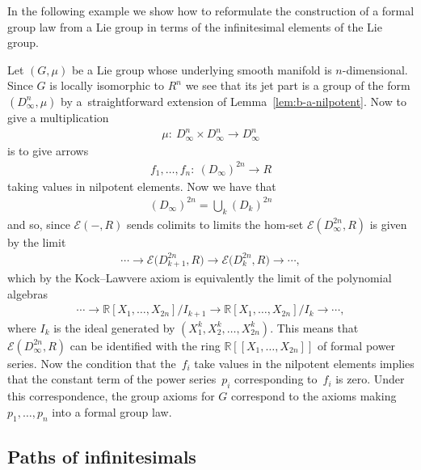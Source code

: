 \documentclass[10pt,a4paper]{amsart}
\numberwithin{equation}{section}
\begin{document}
In the following example we show how to reformulate the construction of a formal group law from a Lie group in terms of the inf\/initesimal elements of the Lie group.
\begin{Example}\label{example-04/27/1504:43:57 PM} Let $(G,\mu)$ be a Lie group whose underlying smooth manifold is $n$-dimensional. Since $G$ is locally isomorphic to $R^{n}$ we see that its jet part is a group of the form $(D_{\infty}^{n},\mu)$ by a~straightforward extension of Lemma~\ref{lem:b-a-nilpotent}. Now to give a multiplication
\begin{gather*}\mu\colon \ D_{\infty}^{n}\times D_{\infty}^{n}\rightarrow D_{\infty}^{n}\end{gather*}
is to give arrows
\begin{gather*}f_{1},\dots ,f_{n}\colon \ (D_{\infty})^{2n}\rightarrow R\end{gather*}
taking values in nilpotent elements. Now we have that
\begin{gather*}(D_{\infty})^{2n}=\bigcup_{k}(D_{k})^{2n}\end{gather*}
and so, since $\mathcal{E}(-,R)$ sends colimits to limits the hom-set $\mathcal{E}(D_{\infty}^{2n},R)$ is given by the limit
\begin{gather*}\cdots \rightarrow\mathcal{E}\big(D_{k+1}^{2n},R\big)\rightarrow\mathcal{E}\big(D_{k}^{2n},R\big)\rightarrow \cdots, \end{gather*}
which by the Kock--Lawvere axiom is equivalently the limit of the polynomial algebras
\begin{gather*}\cdots \rightarrow \mathbb{R}[X_{1},\dots ,X_{2n}]/I_{k+1}\rightarrow \mathbb{R}[X_{1},\dots ,X_{2n}]/I_{k}\rightarrow \cdots, \end{gather*}
where $I_{k}$ is the ideal generated by $(X_{1}^{k},X_{2}^{k},\dots ,X_{2n}^{k})$. This means that $\mathcal{E}(D_{\infty}^{2n},R)$ can be identif\/ied with the ring $\mathbb{R}[[X_{1},\dots ,X_{2n}]]$ of formal power series. Now the condition that the~$f_{i}$ take values in the nilpotent elements implies that the constant term of the power series~$p_{i}$ corresponding to~$f_{i}$ is zero. Under this correspondence, the group axioms for $G$ correspond to the axioms making $p_{1},\dots ,p_{n}$ into a formal group law.
\end{Example}

\subsection{Paths of inf\/initesimals}\label{sec:paths-of-infinitesimals}
\end{document}
